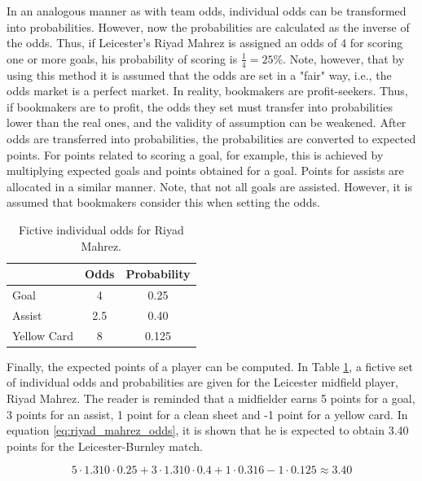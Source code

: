 In an analogous manner as with team odds, individual odds can be transformed into probabilities. However, now the probabilities are calculated as the inverse of the odds. Thus, if Leicester's Riyad Mahrez is assigned an odds of 4 for scoring one or more goals, his probability of scoring is $\frac{1}{4}=25\%$. Note, however, that by using this method it is assumed that the odds are set in a "fair" way, i.e., the odds market is a perfect market. In reality, bookmakers are profit-seekers. Thus, if bookmakers are to profit, the odds they set must transfer into probabilities lower than the real ones, and the validity of assumption can be weakened. After odds are transferred into probabilities, the probabilities are converted to expected points. For points related to scoring a goal, for example, this is achieved by multiplying expected goals and points obtained for a goal. Points for assists are allocated in a similar manner. Note, that not all goals are assisted. However, it is assumed that bookmakers consider this when setting the odds.

\begin{table}[H]
\centering
\begin{tabular}{|lcc|}
\hline
            & Odds & Probability \\ \hline
Goal    \Tstrut    & 4    & 0.25        \\
Assist      & 2.5  & 0.40        \\
Yellow Card \Bstrut & 8    & 0.125       \\ \hline
\end{tabular}
\caption{Fictive individual odds for Riyad Mahrez.}
\label{tab:ind_odds_riyad_mahrez}
\end{table}


Finally, the expected points of a player can be computed. In Table \ref{tab:ind_odds_riyad_mahrez}, a fictive set of individual odds and probabilities are given for the Leicester midfield player, Riyad Mahrez. The reader is reminded that a midfielder earns 5 points for a goal, 3 points for an assist, 1 point for a clean sheet and -1 point for a yellow card. In equation \ref{eq:riyad_mahrez_odds}, it is shown that he is expected to obtain 3.40 points for the Leicester-Burnley match.


\begin{equation} \label{eq:riyad_mahrez_odds}
    5 \cdot 1.310 \cdot 0.25 + 3 \cdot 1.310 \cdot 0.4 + 1 \cdot 0.316 - 1 \cdot 0.125 \approx 3.40
\end{equation}

